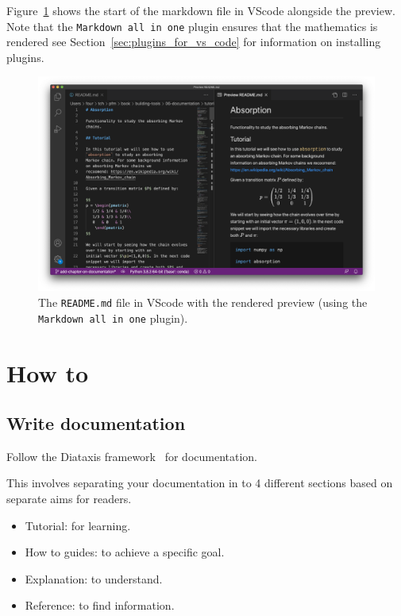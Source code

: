 Figure~\ref{fig:documentation_in_vscode} shows the start of the markdown file
in VScode alongside the preview. Note that the \texttt{Markdown all in one} plugin ensures that
the mathematics is rendered see Section~\ref{sec:plugins_for_vs_code} for
information on installing plugins.

\begin{figure}[htbp]
\centering


\includegraphics[width=0.750\linewidth]{./assets/documentation_in_vscode/main.png}
\caption{The \texttt{README.md} file in VScode with the rendered preview (using
the \texttt{Markdown all in one} plugin).}
\label{fig:documentation_in_vscode}
\end{figure}

\section{How to}
\label{\detokenize{building-tools/06-documentation/how/main:how}}\label{\detokenize{building-tools/06-documentation/how/main::doc}}

\subsection{Write documentation}
\label{\detokenize{building-tools/06-documentation/how/main:how-to-write-documentation}}

Follow the Diataxis framework~\cite{Procida_Diataxis_documentation_framework} for documentation.

This involves separating your documentation in to 4 different sections based on
separate aims for readers.
\begin{itemize}
\item 

Tutorial: for learning.

\item 

How to guides: to achieve a specific goal.

\item 

Explanation: to understand.

\item 

Reference: to find information.

\end{itemize}


